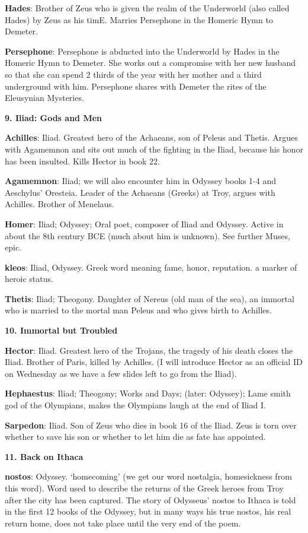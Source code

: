 \documentclass{scrartcl}
\begin{document}
\begin{multicols*}{3}
{\bf Hades}: Brother of Zeus who is given the realm of the Underworld (also called Hades) by Zeus as his timE. Marries Persephone in the Homeric Hymn to Demeter.

{\bf Persephone}: Persephone is abducted into the Underworld by Hades in the Homeric Hymn to Demeter. She works out a compromise with her new husband so that she can spend 2 thirds of the year with her mother and a third underground with him. Persephone shares with Demeter the rites of the Eleusynian Mysteries.


{\bf 9. Iliad: Gods and Men}

{\bf Achilles}: Iliad. Greatest hero of the Achaeans, son of Peleus and Thetis. Argues with Agamemnon and sits out much of the fighting in the Iliad, because his honor has been insulted. Kills Hector in book 22.

{\bf Agamemnon}: Iliad; we will also encounter him in Odyssey books 1-4 and Aeschylus' Oresteia. Leader of the Achaeans (Greeks) at Troy, argues with Achilles. Brother of Menelaus.

{\bf Homer}: Iliad; Odyssey; Oral poet, composer of Iliad and Odyssey. Active in about the 8th century BCE (much about him is unknown). See further Muses, epic.

{\bf kleos}: Iliad, Odyssey. Greek word meaning fame, honor, reputation. a marker of heroic status.

{\bf Thetis}: Iliad; Theogony. Daughter of Nereus (old man of the sea), an immortal who is married to the mortal man Peleus and who gives birth to Achilles.


{\bf 10. Immortal but Troubled}

{\bf Hector}: Iliad. Greatest hero of the Trojans, the tragedy of his death closes the Iliad. Brother of Paris, killed by Achilles. (I will introduce Hector as an official ID on Wednesday as we have a few slides left to go from the Iliad). 

{\bf Hephaestus}: Iliad; Theogony; Works and Days; (later: Odyssey); Lame smith god of the Olympians, makes the Olympians laugh at the end of Iliad I. 

{\bf Sarpedon}: Iliad. Son of Zeus who dies in book 16 of the Iliad. Zeus is torn over whether to save his son or whether to let him die as fate has appointed.


{\bf 11. Back on Ithaca}

{\bf nostos}: Odyssey. `homecoming' (we get our word nostalgia, homesickness from this word). Word used to describe the returns of the Greek heroes from Troy after the city has been captured. The story of Odysseus' nostos to Ithaca is told in the first 12 books of the Odyssey, but in many ways his true nostos, his real return home, does not take place until the very end of the poem.


\end{multicols*}
\end{document}

